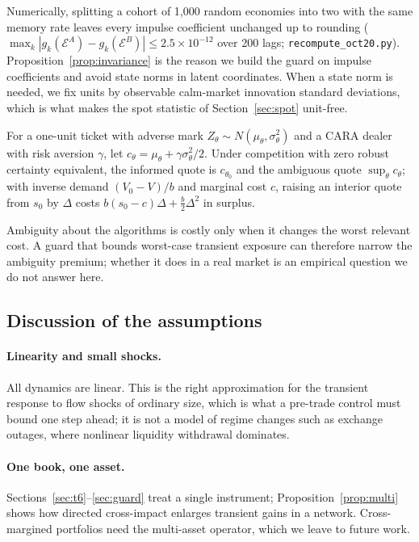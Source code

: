 Numerically, splitting a cohort of 1{,}000 random economies into two with the same memory rate leaves every impulse coefficient unchanged up to rounding ($\max_k|g_k(\mathcal E^A)-g_k(\mathcal E^B)|\le2.5\times10^{-12}$ over 200 lags; \texttt{recompute\_oct20.py}). Proposition~\ref{prop:invariance} is the reason we build the guard on impulse coefficients and avoid state norms in latent coordinates. When a state norm is needed, we fix units by observable calm-market innovation standard deviations, which is what makes the spot statistic of Section~\ref{sec:spot} unit-free.

\begin{proposition}\label{prop:ambig}
For a one-unit ticket with adverse mark $Z_\theta\sim N(\mu_\theta,\sigma_\theta^2)$ and a CARA dealer with risk aversion $\gamma$, let $c_\theta=\mu_\theta+\gamma\sigma_\theta^2/2$. Under competition with zero robust certainty equivalent, the informed quote is $c_{\theta_0}$ and the ambiguous quote $\sup_\theta c_\theta$; with inverse demand $(V_0-V)/b$ and marginal cost $c$, raising an interior quote from $s_0$ by $\Delta$ costs $b(s_0-c)\Delta+\tfrac b2\Delta^2$ in surplus.
\end{proposition}

Ambiguity about the algorithms is costly only when it changes the worst relevant cost. A guard that bounds worst-case transient exposure can therefore narrow the ambiguity premium; whether it does in a real market is an empirical question we do not answer here.

\subsection{Discussion of the assumptions}

\paragraph{Linearity and small shocks.} All dynamics are linear. This is the right approximation for the transient response to flow shocks of ordinary size, which is what a pre-trade control must bound one step ahead; it is not a model of regime changes such as exchange outages, where nonlinear liquidity withdrawal dominates.

\paragraph{One book, one asset.} Sections~\ref{sec:t6}--\ref{sec:guard} treat a single instrument; Proposition~\ref{prop:multi} shows how directed cross-impact enlarges transient gains in a network. Cross-margined portfolios need the multi-asset operator, which we leave to future work.

